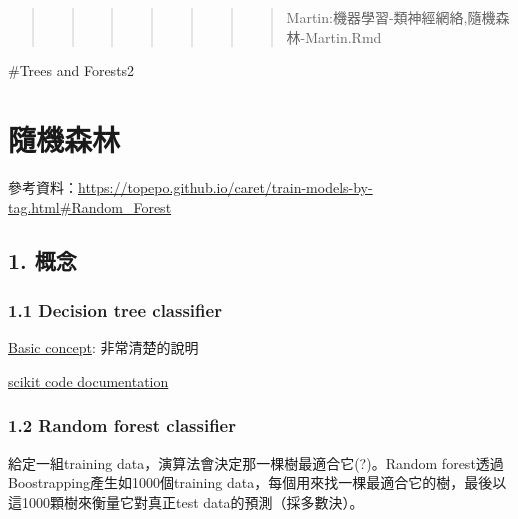 \documentclass[]{book}
\begin{document}
\begin{quote}
\begin{quote}
\begin{quote}
\begin{quote}
\begin{quote}
\begin{quote}
\begin{quote}
Martin:機器學習-類神經網絡,隨機森林-Martin.Rmd
\end{quote}
\end{quote}
\end{quote}
\end{quote}
\end{quote}
\end{quote}
\end{quote}

\#Trees and Forests2

\hypertarget{-1}{%
\section{隨機森林}\label{-1}}

參考資料：\url{https://topepo.github.io/caret/train-models-by-tag.html\#Random_Forest}

\hypertarget{-1}{%
\subsection{1. 概念}\label{-1}}

\hypertarget{decision-tree-classifier-1}{%
\subsubsection{1.1 Decision tree classifier}\label{decision-tree-classifier-1}}

\href{https://medium.com/machine-learning-101/chapter-3-decision-trees-theory-e7398adac567}{Basic concept}: 非常清楚的說明

\href{https://scikit-learn.org/stable/modules/generated/sklearn.tree.DecisionTreeClassifier.html\#sklearn.tree.DecisionTreeClassifier}{scikit code documentation}

\hypertarget{random-forest-classifier-1}{%
\subsubsection{1.2 Random forest classifier}\label{random-forest-classifier-1}}

給定一組training data，演算法會決定那一棵樹最適合它(?)。Random forest透過Boostrapping產生如1000個training data，每個用來找一棵最適合它的樹，最後以這1000顆樹來衡量它對真正test data的預測（採多數決）。
\end{document}
